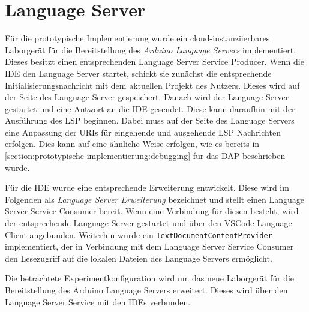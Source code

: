 \section{Language Server}\label{section:prototypische-implementierung:language-server}


Für die prototypische Implementierung wurde ein cloud-instanziierbares Laborgerät für die Bereitstellung des \textit{Arduino Language Servers} \cite{noauthor_arduino-language-server_2025} implementiert. Dieses besitzt einen entsprechenden Language Server Service Producer. Wenn die IDE den Language Server startet, schickt sie zunächst die entsprechende Initialisierungsnachricht mit dem aktuellen Projekt des Nutzers. Dieses wird auf der Seite des Language Server gespeichert. Danach wird der Language Server gestartet und eine Antwort an die IDE gesendet. Diese kann daraufhin mit der Ausführung des \ac{LSP} beginnen. Dabei muss auf der Seite des Language Servers eine Anpassung der URIs für eingehende und ausgehende \ac{LSP} Nachrichten erfolgen. Dies kann auf eine ähnliche Weise erfolgen, wie es bereits in \autoref{section:prototypische-implementierung:debugging} für das \ac{DAP} beschrieben wurde.

Für die IDE wurde eine entsprechende Erweiterung entwickelt. Diese wird im Folgenden als \textit{Language Server Erweiterung} bezeichnet und stellt einen Language Server Service Consumer bereit. Wenn eine Verbindung für diesen besteht, wird der entsprechende Language Server gestartet und über den VSCode Language Client angebunden. Weiterhin wurde ein \texttt{TextDocumentContentProvider} implementiert, der in Verbindung mit dem Language Server Service Consumer den Lesezugriff auf die lokalen Dateien des Language Servers ermöglicht.

Die betrachtete Experimentkonfiguration wird um das neue Laborgerät für die Bereitstellung des Arduino Language Servers erweitert. Dieses wird über den Language Server Service mit den IDEs verbunden.